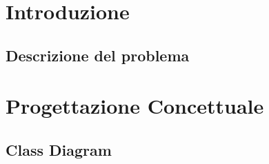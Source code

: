 \documentclass{article}
\title{}
\author{}
\date{}
\begin{document}
\maketitle
\vspace*{-6cm}
\renewcommand{\contentsname}{\LARGE\textbf{Indice}}
\tableofcontents
\newpage

\section{Introduzione}
\subsection{Descrizione del problema}

\section{Progettazione Concettuale}
\subsection{Class Diagram}
\end{document}
